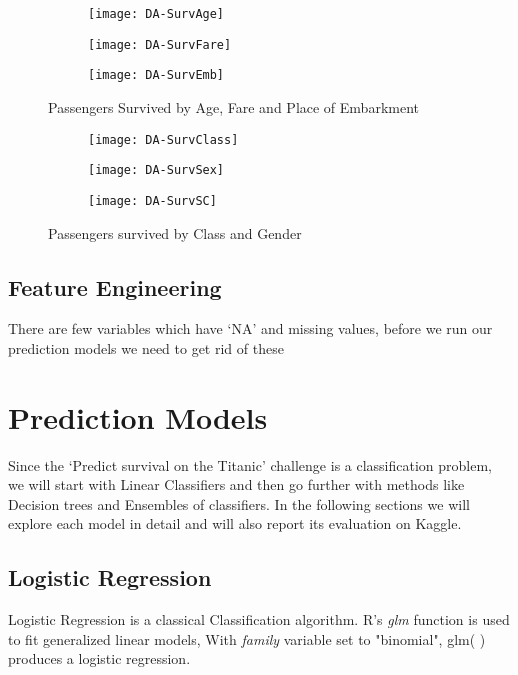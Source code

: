 \documentclass[a4paper,10pt]{report}\usepackage[]{graphicx}\usepackage[]{color}
\begin{document}
\begin{figure}[h]
\centering
  \begin{subfigure}[b]{0.3\textwidth}
    \texttt{[image: DA-SurvAge]}
    \end{subfigure}
  \begin{subfigure}[b]{0.3\textwidth}
    \texttt{[image: DA-SurvFare]}
    \end{subfigure}
    \begin{subfigure}[b]{0.3\textwidth}
    \texttt{[image: DA-SurvEmb]}
  \end{subfigure}
  \caption{Passengers Survived by Age, Fare and Place of Embarkment}\label{Surv}
\end{figure}






\begin{figure}[h]
\centering
  \begin{subfigure}[b]{0.3\textwidth}
    \texttt{[image: DA-SurvClass]}
    \end{subfigure}
  \begin{subfigure}[b]{0.3\textwidth}
    \texttt{[image: DA-SurvSex]}
    \end{subfigure}
  \begin{subfigure}[b]{0.3\textwidth}
    \texttt{[image: DA-SurvSC]}
  \end{subfigure}
  \caption{Passengers survived by Class and Gender}\label{SurvCSE}
\end{figure}

\section{Feature Engineering}
There are few variables which have `NA' and missing values, before we run our prediction models we need to get rid of these
\chapter{Prediction Models}
Since the `Predict survival on the Titanic' challenge is a classification problem, we will start with Linear Classifiers and then go further with methods like Decision trees and Ensembles of classifiers. In the following sections we will explore each model in detail and will also report its evaluation on Kaggle.

\section{Logistic Regression}
Logistic Regression is a classical Classification algorithm. R's \emph{glm} function is used to fit generalized linear models, With \emph{family} variable set to "binomial", glm( ) produces a logistic regression.
\end{document}
